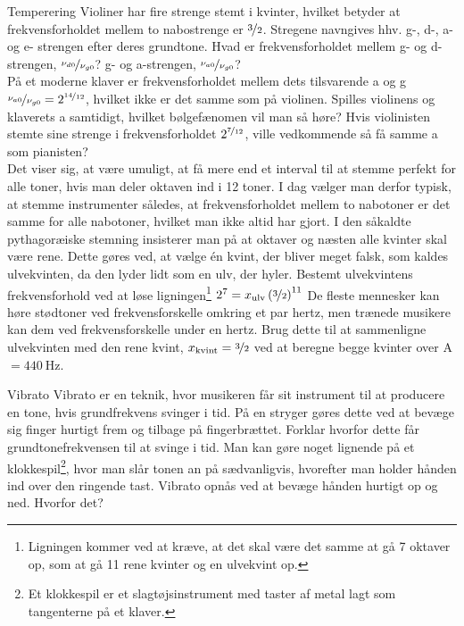 \documentclass[crop=false, class=memoir]{standalone}
\begin{document}
\begin{opgave}[1]{Temperering}
Violiner har fire strenge stemt i kvinter, hvilket betyder at frekvensforholdet mellem to nabostrenge er $\nicefrac{3}{2}$. Stregene navngives hhv. g-, d-, a- og e- strengen efter deres grundtone. Hvad er frekvensforholdet mellem
\opg g- og d-strengen, $\nicefrac{\nu_{d0}}{\nu_{g0}}$?
\opg g- og a-strengen, $\nicefrac{\nu_{a0}}{\nu_{g0}}$? \\[2mm]
På et moderne klaver er frekvensforholdet mellem dets tilsvarende a og g $\nicefrac{\nu_{a0}}{\nu_{g0}} = 2^{\nicefrac{14}{12}}$, hvilket ikke er det samme som på violinen.
\opg Spilles violinens og klaverets a samtidigt, hvilket bølgefænomen vil man så høre?
\opg Hvis violinisten stemte sine strenge i frekvensforholdet $2^{\nicefrac{7}{12}}$, ville vedkommende så få samme a som pianisten? \\[2mm]
Det viser sig, at være umuligt, at få mere end et interval til at stemme perfekt for alle toner, hvis man deler oktaven ind i 12 toner. I dag vælger man derfor typisk, at stemme instrumenter således, at frekvensforholdet mellem to nabotoner er det samme for alle nabotoner, hvilket man ikke altid har gjort. I den såkaldte pythagoræiske stemning insisterer man på at oktaver og næsten alle kvinter skal være rene. Dette gøres ved, at vælge én kvint, der bliver meget falsk, som kaldes ulvekvinten, da den lyder lidt som en ulv, der hyler.
\opg Bestemt ulvekvintens frekvensforhold ved at løse ligningen\footnote{Ligningen kommer ved at kræve, at det skal være det samme at gå 7 oktaver op, som at gå 11 rene kvinter og en ulvekvint op.} $2^7=x_\mathrm{ulv}\left(\nicefrac{3}{2}\right)^{11}$
\opg De fleste mennesker kan høre stødtoner ved frekvensforskelle omkring et par hertz, men trænede musikere kan dem ved frekvensforskelle under en hertz. Brug dette til at sammenligne ulvekvinten med den rene kvint, $x_\mathrm{kvint} = \nicefrac{3}{2}$  ved at beregne begge kvinter over A$=\SI{440}{\hertz}$.
\end{opgave}
\begin{opgave}[2]{Vibrato}
Vibrato er en teknik, hvor musikeren får sit instrument til at producere en tone, hvis grundfrekvens svinger i tid. På en stryger gøres dette ved at bevæge sig finger hurtigt frem og tilbage på fingerbrættet.
\opg Forklar hvorfor dette får grundtonefrekvensen til at svinge i tid.
\opg Man kan gøre noget lignende på et klokkespil\footnote{Et klokkespil er et slagtøjsinstrument med taster af metal lagt som tangenterne på et klaver.}, hvor man slår tonen an på sædvanligvis, hvorefter man holder hånden ind over den ringende tast. Vibrato opnås ved at bevæge hånden hurtigt op og ned. Hvorfor det?
\end{opgave}
\end{document}
